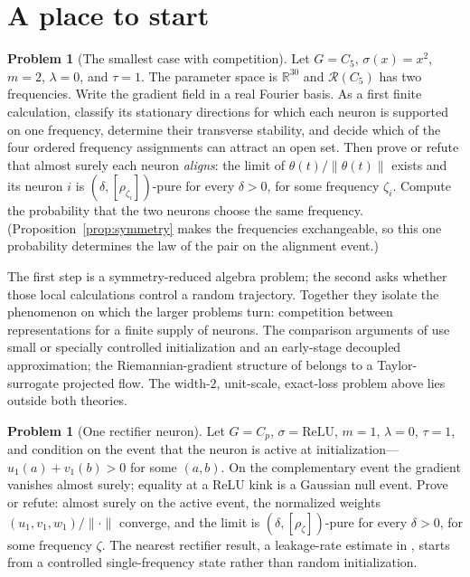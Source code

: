 \documentclass[11pt]{amsart}
\theoremstyle{plain}
\theoremstyle{definition}
\newtheorem{problem}[theorem]{Problem}
\newcommand{\R}{\mathbb{R}}
\newcommand{\Rcl}{\mathcal{R}}
\begin{document}
\section{A place to start}\label{sec:start}

\begin{problem}[The smallest case with competition]\label{start:c5}
Let $G = C_5$, $\sigma(x) = x^2$, $m = 2$, $\lambda = 0$, and $\tau = 1$. The parameter space is $\R^{30}$ and $\Rcl(C_5)$ has two frequencies. Write the gradient field in a real Fourier basis. As a first finite calculation, classify its stationary directions for which each neuron is supported on one frequency, determine their transverse stability, and decide which of the four ordered frequency assignments can attract an open set. Then prove or refute that almost surely each neuron \emph{aligns}: the limit of $\theta(t)/\|\theta(t)\|$ exists and its neuron $i$ is $(\delta,[\rho_{\zeta_i}])$-pure for every $\delta>0$, for some frequency $\zeta_i$. Compute the probability that the two neurons choose the same frequency. (Proposition~\ref{prop:symmetry} makes the frequencies exchangeable, so this one probability determines the law of the pair on the alignment event.)
\end{problem}

The first step is a symmetry-reduced algebra problem; the second asks whether those local calculations control a random trajectory. Together they isolate the phenomenon on which the larger problems turn: competition between representations for a finite supply of neurons. The comparison arguments of \cite{he2026grokking} use small or specially controlled initialization and an early-stage decoupled approximation; the Riemannian-gradient structure of \cite{he2026spectral} belongs to a Taylor-surrogate projected flow. The width-$2$, unit-scale, exact-loss problem above lies outside both theories.

\begin{problem}[One rectifier neuron]\label{start:relu}
Let $G = C_p$, $\sigma = \mathrm{ReLU}$, $m = 1$, $\lambda = 0$, $\tau = 1$, and condition on the event that the neuron is active at initialization---$u_1(a) + v_1(b) > 0$ for some $(a,b)$. On the complementary event the gradient vanishes almost surely; equality at a ReLU kink is a Gaussian null event. Prove or refute: almost surely on the active event, the normalized weights $(u_1, v_1, w_1)/\|\cdot\|$ converge, and the limit is $(\delta, [\rho_\zeta])$-pure for every $\delta > 0$, for some frequency $\zeta$. The nearest rectifier result, a leakage-rate estimate in \cite{he2026grokking}, starts from a controlled single-frequency state rather than random initialization.
\end{problem}
\end{document}
